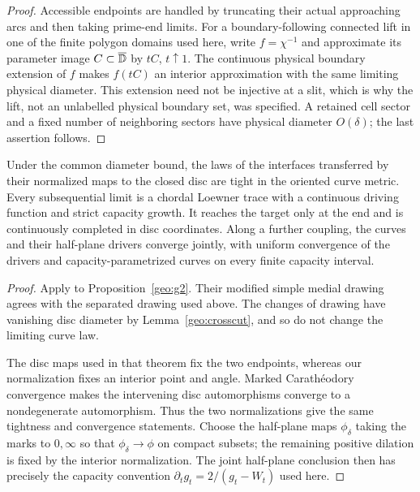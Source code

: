 \begin{proof}
Accessible endpoints are handled by truncating their actual
approaching arcs and then taking prime-end limits. For a
boundary-following connected lift in one of the finite polygon
domains used here, write \(f=\chi^{-1}\) and approximate its
parameter image \(C\subset\overline{\mathbb D}\) by \(tC\), \(t\uparrow1\).
The continuous physical boundary extension of \(f\) makes
\(f(tC)\) an interior approximation with the same limiting
physical diameter. This extension need not be injective at a
slit, which is why the lift, not an unlabelled physical boundary
set, was specified. A retained cell sector and a fixed number
of neighboring sectors have physical diameter \(O(\delta)\);
the last assertion follows.
\end{proof}

\begin{proposition}
\label{geo:compactness}
Under the common diameter bound, the laws of the interfaces transferred
by their normalized maps to the closed disc are tight in the oriented
curve metric. Every subsequential limit is a chordal Loewner trace with
a continuous driving function and strict capacity growth. It reaches
the target only at the end and is continuously completed in disc
coordinates. Along a further coupling, the curves and their
half-plane drivers converge jointly, with uniform convergence of the
drivers and capacity-parametrized curves on every finite capacity
interval.
\end{proposition}

\begin{proof}
Apply \cite[Theorem 1.5 and Corollary 1.7]{KS} to
Proposition~\ref{geo:g2}. Their modified simple medial drawing agrees
with the separated drawing used above. The changes of drawing have
vanishing disc diameter by Lemma~\ref{geo:crosscut}, and so do not
change the limiting curve law.

The disc maps used in that theorem fix the two endpoints, whereas our
normalization fixes an interior point and angle. Marked Carath\'eodory
convergence makes the intervening disc automorphisms converge to a
nondegenerate automorphism. Thus the two normalizations give the same
tightness and convergence statements. Choose the half-plane maps
\(\phi_\delta\) taking the marks to \(0,\infty\) so that
\(\phi_\delta\to\phi\) on compact subsets; the remaining positive
dilation is fixed by the interior normalization. The joint
half-plane conclusion then has precisely the capacity convention
\(\partial_tg_t=2/(g_t-W_t)\) used here.
\end{proof}

